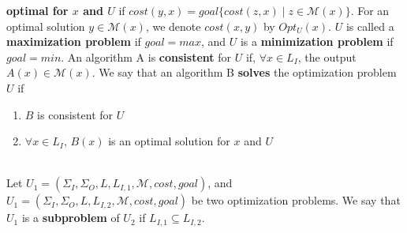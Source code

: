 \begin{tabu}
{   {\bf optimal for $x$ and $U$} if $cost(y, x) = goal\{cost(z,x) \mid z \in
   \mathcal{M}(x)\}$. \newline
   For an optimal solution $y \in \mathcal{M}(x)$, we denote $cost(x,y)$ by
   $Opt_U(x)$. $U$ is called a {\bf maximization problem} if $goal = max$,
   and $U$ is a {\bf minimization problem} if $goal = min$. \newline
   An algorithm A is {\bf consistent} for $U$ if, $\forall x \in L_I$, the
   output $A(x) \in \mathcal{M}(x)$. We say that an algorithm B {\bf solves} the
   optimization problem $U$ if
   \begin{enumerate} \itemsep1pt \parskip0pt  \vspace{-\medskipamount}
   \item $B$ is consistent for $U$
   \item $\forall x \in L_I$, $B(x)$ is an optimal solution for $x$ and $U$
   \vspace{-\medskipamount} \end{enumerate}} \\ \hline
 {Let $U_1 = (\Sigma_I, \Sigma_O, L, L_{I,1}, \mathcal{M}, cost,
 goal)$, and $ U_1 = (\Sigma_I, \Sigma_O, L, L_{I,2}, \mathcal{M}, cost, goal)$
 be two optimization problems. We say that $U_1$ is a {\bf subproblem} of $U_2$
 if $L_{I,1} \subseteq L_{I,2}$.}
\end{tabu}
